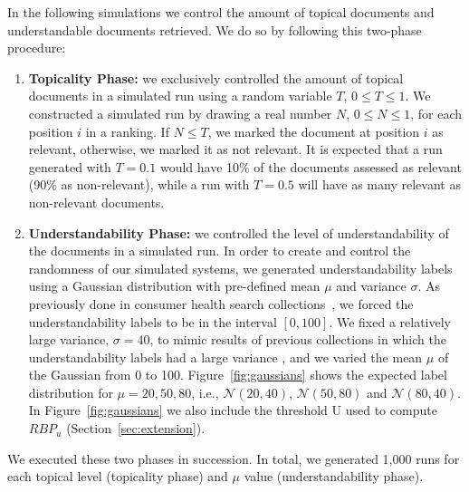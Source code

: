 

In the following simulations we control the amount of topical documents and understandable documents retrieved. We do so by following this two-phase procedure:

\begin{enumerate}
\item \textbf{Topicality Phase:} we exclusively controlled the amount of topical documents in a simulated run using a random variable $T$, $0 \le T \le 1$. 
We constructed a simulated run by drawing a real number $N$, $0 \le N \le 1$, for each position $i$ in a ranking. If $N \le T$, we marked the document at position $i$ as relevant, otherwise, we marked it as not relevant. It is expected that a run generated with $T=0.1$ would have 10\% of the documents assessed as relevant (90\% as non-relevant), while a run with $T=0.5$ will have as many relevant as non-relevant documents. 

\item \textbf{Understandability Phase:}  we controlled the level of understandability of the documents in a simulated run. In order to create and control the randomness of our simulated systems, we generated understandability labels using a Gaussian distribution with pre-defined mean $\mu$ and variance $\sigma$. 
As previously done in consumer health search collections~\cite{clefIR16,clefIR17}, we forced the understandability labels to be in the interval $[0,100]$. 
We fixed a relatively large variance, $\sigma=40$, to mimic results of previous collections in which the understandability labels had a large variance \cite{clefIR16}, and we varied the mean $\mu$ of the Gaussian from 0 to 100. Figure~\ref{fig:gaussians} shows the expected label distribution for $\mu=20, 50, 80$, i.e., $\mathcal{N}(20, 40)$, $\mathcal{N}(50, 80)$ and $\mathcal{N}(80, 40)$.
In Figure~\ref{fig:gaussians} we also include the threshold U used to compute $RBP_u$ (Section~\ref{sec:extension}).
\end{enumerate}

We executed these two phases in succession. In total, we generated 1,000 runs for each topical level (topicality phase) and $\mu$ value (understandability phase). 


